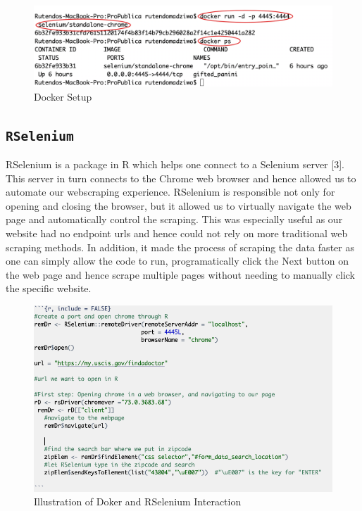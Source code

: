 \documentclass[10pt,letterpaper]{article}
\begin{document}
\begin{figure}
\includegraphics[width=1\linewidth]{docker_start} \caption{Docker Setup}\label{fig:unnamed-chunk-2}
\end{figure}

\subsection{\texorpdfstring{\texttt{RSelenium}}{RSelenium}}\label{rselenium}

RSelenium is a package in R which helps one connect to a Selenium server
{[}3{]}. This server in turn connects to the Chrome web browser and
hence allowed us to automate our webscraping experience. RSelenium is
responsible not only for opening and closing the browser, but it allowed
us to virtually navigate the web page and automatically control the
scraping. This was especially useful as our website had no endpoint urls
and hence could not rely on more traditional web scraping methods. In
addition, it made the process of scraping the data faster as one can
simply allow the code to run, programatically click the Next button on
the web page and hence scrape multiple pages without needing to manually
click the specific website.

\begin{figure}
\includegraphics[width=1\linewidth]{docker_selenium} \caption{Illustration of Doker and RSelenium Interaction}\label{fig:unnamed-chunk-3}
\end{figure}
\end{document}
